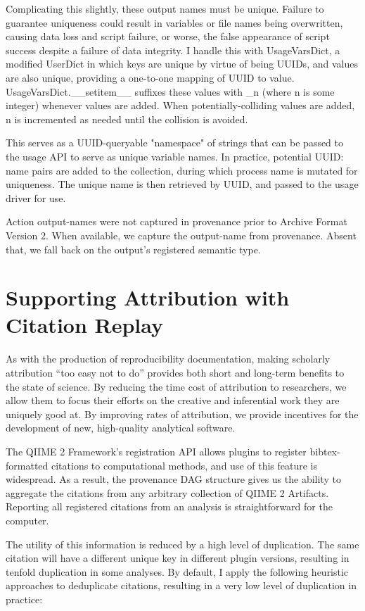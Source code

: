 Complicating this slightly, these output names must be unique. Failure to
guarantee uniqueness could result in variables or file names being overwritten,
causing data loss and script failure, or worse, the false appearance of script
success despite a failure of data integrity. I handle this with UsageVarsDict, a
modified UserDict in which keys are unique by virtue of being UUIDs, and values
are also unique, providing a one-to-one mapping of UUID to value.
UsageVarsDict.\_\_setitem\_\_ suffixes these values with \_n (where n is some
integer) whenever values are added. When potentially-colliding values are added,
n is incremented as needed until the collision is avoided. 

This serves as a UUID-queryable "namespace" of strings that can be passed to the
usage API to serve as unique variable names. In practice, potential {UUID: name}
pairs are added to the collection, during which process name is mutated for
uniqueness. The unique name is then retrieved by UUID, and passed to the usage
driver for use.

Action output-names were not captured in provenance prior to Archive Format
Version 2. When available, we capture the output-name from provenance. Absent
that, we fall back on the output’s registered semantic type.



\section{Supporting Attribution with Citation Replay}

As with the production of reproducibility documentation, making scholarly
attribution “too easy not to do” provides both short and long-term benefits to
the state of science. By reducing the time cost of attribution to researchers,
we allow them to focus their efforts on the creative and inferential work they
are uniquely good at. By improving rates of attribution, we provide incentives
for the development of new, high-quality analytical software. 

The QIIME 2 Framework’s registration API allows plugins to register
bibtex-formatted citations to computational methods, and use of this feature is
widespread. As a result, the provenance DAG structure gives us the ability to
aggregate the citations from any arbitrary collection of QIIME 2 Artifacts.
Reporting all registered citations from an analysis is straightforward for the
computer.

The utility of this information is reduced by a high level of duplication. The
same citation will have a different unique key in different plugin versions,
resulting in tenfold duplication in some analyses. By default, I apply the
following heuristic approaches to deduplicate citations, resulting in a very low
level of duplication in practice:

